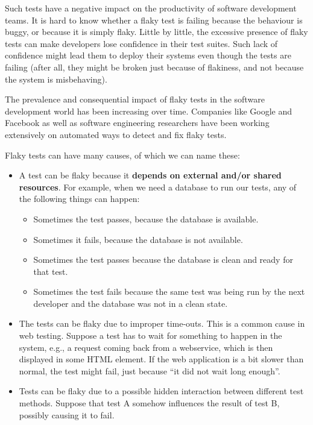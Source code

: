 Such tests have a negative impact on the productivity of software
development teams. It is hard to know whether a flaky test is failing
because the behaviour is buggy, or because it is simply flaky. Little by
little, the excessive presence of flaky tests can make developers lose
confidence in their test suites. Such lack of confidence might lead them
to deploy their systems even though the tests are failing (after all,
they might be broken just because of flakiness, and not because the
system is misbehaving).

The prevalence and consequential impact of flaky tests in the software
development world has been increasing over time. Companies like Google
and Facebook as well as software engineering researchers have been
working extensively on automated ways to detect and fix flaky tests.

Flaky tests can have many causes, of which we can name these:

\begin{itemize}
\item
  A test can be flaky because it \textbf{depends on external and/or
  shared resources}. For example, when we need a database to run our
  tests, any of the following things can happen:

  \begin{itemize}
  \tightlist
  \item
    Sometimes the test passes, because the database is available.
  \item
    Sometimes it fails, because the database is not available.
  \item
    Sometimes the test passes because the database is clean and ready
    for that test.
  \item
    Sometimes the test fails because the same test was being run by the
    next developer and the database was not in a clean state.
  \end{itemize}
\item
  The tests can be flaky due to improper time-outs. This is a common
  cause in web testing. Suppose a test has to wait for something to
  happen in the system, e.g., a request coming back from a webservice,
  which is then displayed in some HTML element. If the web application
  is a bit slower than normal, the test might fail, just because ``it
  did not wait long enough''.
\item
  Tests can be flaky due to a possible hidden interaction between
  different test methods. Suppose that test A somehow influences the
  result of test B, possibly causing it to fail.
\end{itemize}

